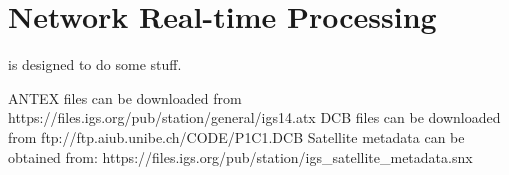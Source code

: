 \section{Network Real-time Processing}

 is designed to do some stuff.

ANTEX files can be downloaded from https://files.igs.org/pub/station/general/igs14.atx
DCB files can be downloaded from ftp://ftp.aiub.unibe.ch/CODE/P1C1.DCB
Satellite metadata can be obtained from: https://files.igs.org/pub/station/igs\_satellite\_metadata.snx